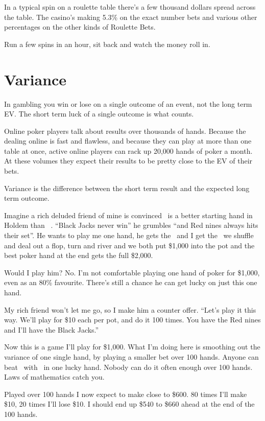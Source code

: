 In a typical spin on a roulette table there's a few thousand dollars
spread across the table. The casino's making 5.3\% on the exact number
bets and various other percentages on the other kinds of Roulette Bets.

Run a few spins in an hour, sit back and watch the money roll in.

\section{Variance}

In gambling you win or lose on a single outcome of an event,
not the long term EV. The short term luck of a single outcome
is what counts.

Online poker players talk about results over thousands of hands. Because the
dealing online is fast and flawless, and because they can play at
more than one table at once, active online players can rack up
20,000 hands of poker a month. At these volumes they expect their
results to be pretty close to the EV of their bets.

Variance is the difference between the short term result and the
expected long term outcome.

Imagine a rich deluded friend of mine is convinced \nineh\nined\ is a better
starting hand in Holdem than \Jc\Js\ . ``Black Jacks never win'' he grumbles
``and Red nines always hits their set''. He wants to play me one hand, he
gets the \nineh\nined\ and I get the \Jc\Js\, we shuffle and deal out a flop,
turn and river and we both put \$1,000 into the pot and the best
poker hand at the end gets the full \$2,000.

Would I play him? No. I'm not comfortable playing one hand of poker
for \$1,000, even as an 80\% favourite. There's still a chance he can get
lucky on just this one hand.

My rich friend won't let me go, so I make him a counter offer.
``Let's play it this way. We'll play for \$10 each per pot, and do
it 100 times. You have the Red nines and I'll have the Black Jacks.''

Now this is a game I'll play for \$1,000. What I'm doing here is smoothing
out the variance of one single hand, by playing a smaller bet over
100 hands. Anyone can beat \Jc\Js\ with \nineh\nined\ in one lucky
hand. Nobody can do it often enough over 100 hands. Laws of mathematics
catch you.

Played over 100 hands I now expect to make close to \$600. 80 times I'll
make \$10, 20 times I'll lose \$10. I should end up \$540 to \$660 ahead
at the end of the 100 hands.

